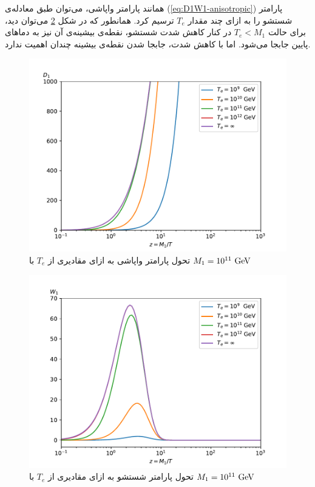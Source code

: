 \documentclass[a4paper]{book}
\begin{document}
همانند پارامتر واپاشی، می‌توان طبق معادله‌ی (\ref{eq:D1W1-anisotropic}) پارامتر شستشو را به ازای چند مقدار {\footnotesize$T_e$} ترسیم کرد. همانطور که در شکل \ref{fig:W1-anisotropic} می‌توان دید، برای حالت {\footnotesize$T_e<M_1$} در کنار کاهش شدت شستشو، نقطه‌ی بیشینه‌ی آن نیز به دماهای پایین جابجا می‌شود. اما با کاهش شدت، جابجا شدن نقطه‌ی بیشینه چندان اهمیت ندارد.
\begin{figure}[!h]
	\centering
	\includegraphics[width=13cm]{fig-D1-anisotropic.pdf}
	\caption{تحول پارامتر واپاشی به ازای مقادیری از {\footnotesize$T_e$} با {\footnotesize$M_1 = 10^{11}\ \rm GeV$} \label{fig:D1-anisotropic}}
\end{figure}
\begin{figure}[!h]
	\centering
	\includegraphics[width=13cm]{fig-W1-anisotropic.pdf}
	\caption{تحول پارامتر شستشو به ازای مقادیری از {\footnotesize$T_e$} با {\footnotesize$M_1 = 10^{11}\ \rm GeV$} \label{fig:W1-anisotropic}}
\end{figure}
\end{document}
